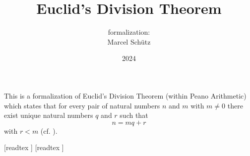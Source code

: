 \documentclass{article}
\title{Euclid's Division Theorem}
\author{\Naproche formalization: \vspace{0.5em} \\
Marcel Schütz}
\date{2024}
\begin{document}
  \maketitle

  \noindent This is a formalization of Euclid's Division Theorem
  (within Peano Arithmetic) which states
  that for every pair of natural numbers $n$ and $m$ with $m \neq 0$ there
  exist unique natural numbers $q$ and $r$ such that
  \[n = mq + r\]
  with $r < m$  (cf. \cite[p. 17]{Burton2005}).

  \begin{imports}
    \begin{forthel}
      [readtex ]
      [readtex ]
    \end{forthel}
  \end{imports}
\end{document}
